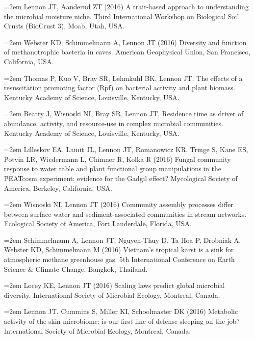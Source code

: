 \documentclass[11pt]{article}
\begin{document}
{\hangindent=2em Lennon JT, Aanderud ZT (2016) A trait-based approach to understanding the microbial moisture niche. Third International Workshop on Biological Soil Crusts (BioCrust 3), Moab, Utah, USA. \par

\hangindent=2em Webster KD, Schimmelmann A, Lennon JT (2016) Diversity and function of methanotrophic bacteria in caves. American Geophysical Union, San Francisco, California, USA. \par

\hangindent=2em Thomas P, Kuo V, Bray SR, Lehmkuhl BK, Lennon JT. The effects of a resuscitation promoting factor (Rpf) on bacterial activity and plant biomass. Kentucky Academy of Science, Louisville, Kentucky, USA. \par

\hangindent=2em Beatty J, Wisnoski NI, Bray SR, Lennon JT. Residence time as driver of abundance, activity, and resource-use in complex microbial communities. Kentucky Academy of Science, Louisville, Kentucky, USA. \par

\hangindent=2em Lilleskov EA, Lamit JL, Lennon JT, Romanowicz KR, Tringe S, Kane ES, Potvin LR, Wiedermann L, Chimner R, Kolka R (2016) Fungal community response to water table and plant functional group manipulations in the PEATcosm experiment: evidence for the Gadgil effect? Mycological Society of America, Berkeley, California, USA. \par

\hangindent=2em Wisnoski NI, Lennon JT (2016) Community assembly processes differ between surface water and sediment-associated communities in stream networks. Ecological Society of America, Fort Lauderdale, Florida, USA. \par

\hangindent=2em Schimmelmann A, Lennon JT, Nguyen-Thuy D, Ta Hoa P, Drobniak A, Webster KD, Schimmelmann M (2016) Vietnam’s tropical karst is a sink for atmospheric methane greenhouse gas. 5th International Conference on Earth Science \& Climate Change, Bangkok, Thailand. \par

\hangindent=2em Locey KE, Lennon JT (2016) Scaling laws predict global microbial diversity. International Society of Microbial Ecology, Montreal, Canada. \par

\hangindent=2em Lennon JT, Cummins S, Miller KI, Schoolmaster DK (2016) Metabolic activity of the skin microbiome: is our first line of defense sleeping on the job? International Society of Microbial Ecology, Montreal, Canada. \par

}
\end{document}
